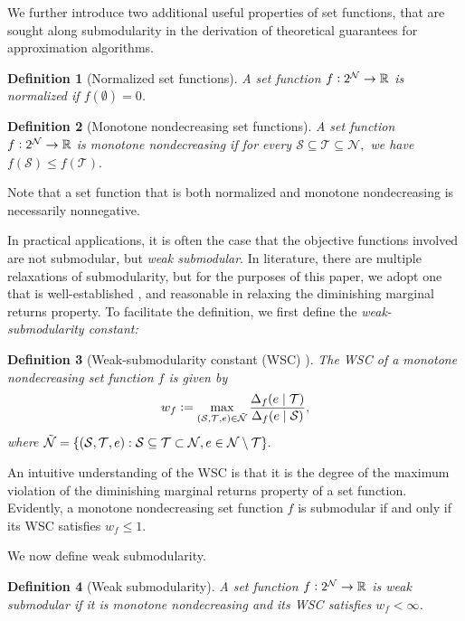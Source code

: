 \documentclass[letter,11pt]{article}
\newtheorem{definition}{Definition}[]
\def\sS{\mathcal{S}}
\def\sN{\mathcal{N}}
\begin{document}
We further introduce two additional useful properties of set functions, that are sought along submodularity in the derivation of theoretical guarantees for approximation algorithms.
\begin{definition}[Normalized set functions]
A set function $f\vcentcolon 2^\sN \rightarrow \mathbb{R}$ is \textit{normalized} if $f(\emptyset) = 0$.
\end{definition}
\begin{definition}[Monotone nondecreasing set functions]
A set function $f\vcentcolon 2^\sN \rightarrow \mathbb{R}$ is \textit{monotone nondecreasing} if for every $\sS\subseteq \mathcal{T} \subseteq \sN,$ we have $f(\sS) \leq f(\mathcal{T}).$
\end{definition}

Note that a set function that is both normalized and monotone nondecreasing is necessarily nonnegative.

In practical applications, it is often the case that the objective functions involved are not submodular, but \textit{weak submodular}. In literature, there are multiple relaxations of submodularity, but for the purposes of this paper, we adopt one that is well-established \cite{routing, approximate, quadratic, hibbard_hashemi_tanaka_topcu_2023, kaya2024randomizedgreedymethodsweak}, and reasonable in relaxing the diminishing marginal returns property. To facilitate the definition, we first define the \textit{weak-submodularity constant:}
\begin{definition}[Weak-submodularity constant (WSC) \cite{hibbard_hashemi_tanaka_topcu_2023}]\label{def:wsc} The WSC of a monotone nondecreasing set function $f$ is given by
\begin{equation}
w_f \vcentcolon= \max_{(\sS, \mathcal{T}, e) \in \Tilde{\sN}} \dfrac{\Delta_f(e\mid \mathcal{T})}{\Delta_f(e\mid \sS)},
\end{equation}
where $\Tilde{\sN} = \{(\sS, \mathcal{T}, e): \sS \subseteq \mathcal{T} \subset \sN, e \in \sN \setminus \mathcal{T}\}.$
\end{definition}
An intuitive understanding of the WSC is that it is the degree of the maximum violation of the diminishing marginal returns property of a set function. Evidently, a monotone nondecreasing set function $f$ is submodular if and only if its WSC satisfies $w_f \leq 1$.

We now define weak submodularity.
\begin{definition}[Weak submodularity]\label{def:weaksubmod}
A set function $f \vcentcolon 2^\sN \to \mathbb{R}$ is weak submodular if it is monotone nondecreasing and its WSC satisfies $w_f < \infty$.
\end{definition}
\end{document}
